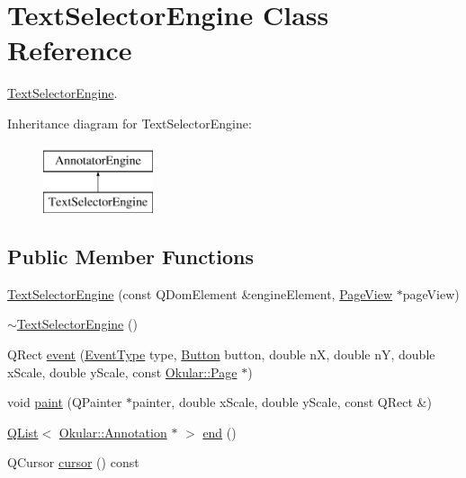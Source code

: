 \hypertarget{classTextSelectorEngine}{\section{Text\+Selector\+Engine Class Reference}
\label{classTextSelectorEngine}
}


\hyperlink{classTextSelectorEngine}{Text\+Selector\+Engine}.  


Inheritance diagram for Text\+Selector\+Engine\+:\begin{figure}[H]
\begin{center}
\leavevmode
\includegraphics[height=2.000000cm]{classTextSelectorEngine}
\end{center}
\end{figure}
\subsection*{Public Member Functions}
\begin{DoxyCompactItemize}
\item 
\hyperlink{classTextSelectorEngine_a3cc559125469600531380e46ea9b90f0}{Text\+Selector\+Engine} (const Q\+Dom\+Element \&engine\+Element, \hyperlink{classPageView}{Page\+View} $\ast$page\+View)
\item 
\hyperlink{classTextSelectorEngine_ad785da133bf47a37a2f0b94908bc44fa}{$\sim$\+Text\+Selector\+Engine} ()
\item 
Q\+Rect \hyperlink{classTextSelectorEngine_a960e484c0c32e6500d9e75d676d0c60e}{event} (\hyperlink{classAnnotatorEngine_a00fb22eb4cb6eafb056f9066031db133}{Event\+Type} type, \hyperlink{classAnnotatorEngine_ac2e3b75e12bacbb6974d15dd53954567}{Button} button, double n\+X, double n\+Y, double x\+Scale, double y\+Scale, const \hyperlink{classOkular_1_1Page}{Okular\+::\+Page} $\ast$)
\item 
void \hyperlink{classTextSelectorEngine_a68b752c46a1371f4caa0eb692553ff5c}{paint} (Q\+Painter $\ast$painter, double x\+Scale, double y\+Scale, const Q\+Rect \&)
\item 
\hyperlink{classQList}{Q\+List}$<$ \hyperlink{classOkular_1_1Annotation}{Okular\+::\+Annotation} $\ast$ $>$ \hyperlink{classTextSelectorEngine_ac0478924c3210f726bedf6c10a50141e}{end} ()
\item 
Q\+Cursor \hyperlink{classTextSelectorEngine_a0b4309d25b8f6d56570f5a39bf6722fc}{cursor} () const 
\end{DoxyCompactItemize}
